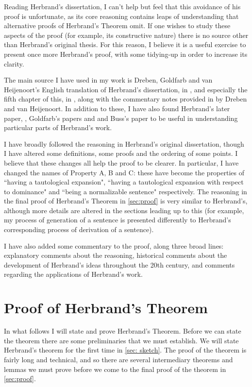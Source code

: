 \documentclass[a4paper,12pt]{report}
\theoremstyle{definition}
\begin{document}
Reading Herbrand's dissertation, I can't help but feel that this avoidance of his proof is unfortunate, as its core reasoning contains leaps of understanding that alternative proofs of Herbrand's Theorem omit. If one wishes to study these aspects of the proof (for example, its constructive nature) there is no source other than Herbrand's original thesis. For this reason, I believe it is a useful exercise to present once more Herbrand's proof, with some tidying-up in order to increase its clarity.

The main source I have used in my work is Dreben, Goldfarb and van Heijenoort's English translation of Herbrand's dissertation, in \cite{herb english}, and especially the fifth chapter of this, in \cite{f to g}, along with the commentary notes provided in \cite{f to g} by Dreben and van Heijenoort. In addition to these, I have also found Herbrand's later paper, \cite{jh consistency}, Goldfarb's papers \cite{goldfarb90} and \cite{goldfarb93} and Buss's paper \cite{buss OHT} to be useful in understanding particular parts of Herbrand's work.

I have broadly followed the reasoning in Herbrand's original dissertation, though I have altered some definitions, some proofs and the ordering of some points. I believe that these changes all help the proof to be clearer. In particular, I have changed the names of Property A, B and C: these have become the properties of ``having a tautological expansion", ``having a tautological expansion with respect to dominance" and ``being a normalizable sentence" respectively. The reasoning in the final proof of Herbrand's Theorem in \ref{sec:proof} is very similar to Herbrand's, although more details are altered in the sections leading up to this (for example, my process of generation of a sentence is presented differently to Herbrand's corresponding process of derivation of a sentence).

I have also added some commentary to the proof, along three broad lines: explanatory comments about the reasoning, historical comments about the development of Herbrand's ideas throughout the 20th century, and comments regarding the applications of Herbrand's work.

\chapter{Proof of Herbrand's Theorem}

In what follows I will state and prove Herbrand's Theorem. Before we can state the theorem there are some preliminaries that we must establish. We will state Herbrand's theorem for the first time in \ref{sec: sketch}. The proof of the theorem is fairly long and technical, and so there are several intermediary theorems and lemmas we must prove before we come to the final proof of the theorem in \ref{sec:proof}.
\end{document}
